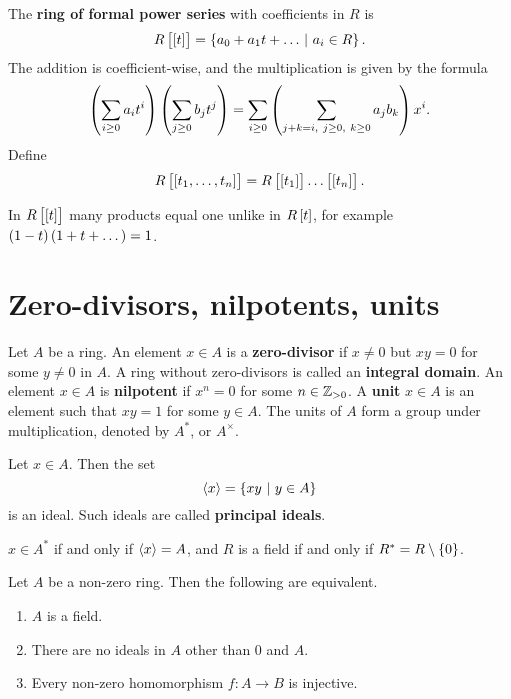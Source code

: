 \begin{definition}
The \textbf{ring of formal power series} with coefficients in $ R $ is
$$ R\sbr{\sbr{t}} = \cbr{a_0 + a_1t + \dots \st a_i \in R}. $$
The addition is coefficient-wise, and the multiplication is given by the formula
$$ \br{\sum_{i \ge 0} a_it^i}\br{\sum_{j \ge 0} b_jt^j} = \sum_{i \ge 0} \br{\sum_{j + k = i, \ j \ge 0, \ k \ge 0} a_jb_k}x^i. $$
Define
$$ R\sbr{\sbr{t_1, \dots, t_n}} = R\sbr{\sbr{t_1}} \dots \sbr{\sbr{t_n}}. $$
\end{definition}

In $ R\sbr{\sbr{t}} $ many products equal one unlike in $ R\sbr{t} $, for example $ \br{1 - t}\br{1 + t + \dots} = 1 $.

\section{Zero-divisors, nilpotents, units}

\begin{definition}
Let $ A $ be a ring. An element $ x \in A $ is a \textbf{zero-divisor} if $ x \ne 0 $ but $ xy = 0 $ for some $ y \ne 0 $ in $ A $. A ring without zero-divisors is called an \textbf{integral domain}. An element $ x \in A $ is \textbf{nilpotent} if $ x^n = 0 $ for some $ n \in \mathbb{Z}_{> 0} $. A \textbf{unit} $ x \in A $ is an element such that $ xy = 1 $ for some $ y \in A $. The units of $ A $ form a group under multiplication, denoted by $ A^* $, or $ A^\times $.
\end{definition}

\begin{definition}
Let $ x \in A $. Then the set
$$ \abr{x} = \cbr{xy \st y \in A} $$
is an ideal. Such ideals are called \textbf{principal ideals}.
\end{definition}

\begin{remark*}
$ x \in A^* $ if and only if $ \left\langle x \right\rangle = A $, and $ R $ is a field if and only if $ R^* = R \setminus \cbr{0} $.
\end{remark*}

\begin{proposition}
Let $ A $ be a non-zero ring. Then the following are equivalent.
\begin{enumerate}
\item $ A $ is a field.
\item There are no ideals in $ A $ other than $ 0 $ and $ A $.
\item Every non-zero homomorphism $ f : A \to B $ is injective.
\end{enumerate}
\end{proposition}


